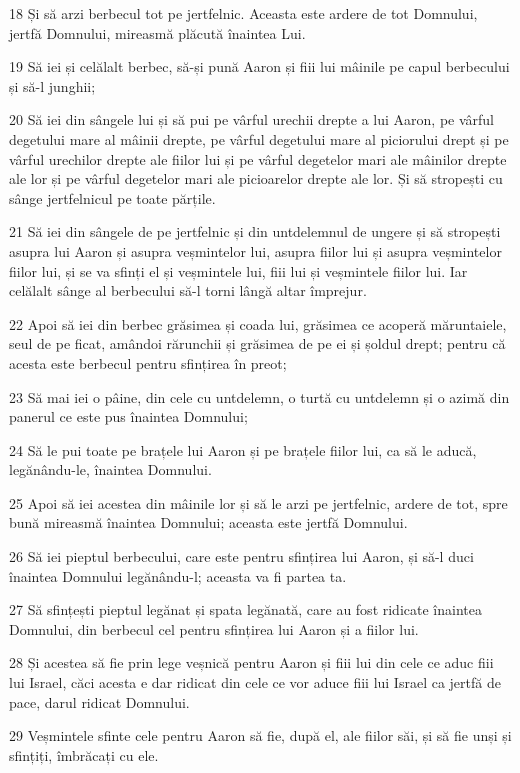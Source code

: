\par 18 Și să arzi berbecul tot pe jertfelnic. Aceasta este ardere de tot Domnului, jertfă Domnului, mireasmă plăcută înaintea Lui.
\par 19 Să iei și celălalt berbec, să-și pună Aaron și fiii lui mâinile pe capul berbecului și să-l junghii;
\par 20 Să iei din sângele lui și să pui pe vârful urechii drepte a lui Aaron, pe vârful degetului mare al mâinii drepte, pe vârful degetului mare al piciorului drept și pe vârful urechilor drepte ale fiilor lui și pe vârful degetelor mari ale mâinilor drepte ale lor și pe vârful degetelor mari ale picioarelor drepte ale lor. Și să stropești cu sânge jertfelnicul pe toate părțile.
\par 21 Să iei din sângele de pe jertfelnic și din untdelemnul de ungere și să stropești asupra lui Aaron și asupra veșmintelor lui, asupra fiilor lui și asupra veșmintelor fiilor lui, și se va sfinți el și veșmintele lui, fiii lui și veșmintele fiilor lui. Iar celălalt sânge al berbecului să-l torni lângă altar împrejur.
\par 22 Apoi să iei din berbec grăsimea și coada lui, grăsimea ce acoperă măruntaiele, seul de pe ficat, amândoi rărunchii și grăsimea de pe ei și șoldul drept; pentru că acesta este berbecul pentru sfințirea în preot;
\par 23 Să mai iei o pâine, din cele cu untdelemn, o turtă cu untdelemn și o azimă din panerul ce este pus înaintea Domnului;
\par 24 Să le pui toate pe brațele lui Aaron și pe brațele fiilor lui, ca să le aducă, legănându-le, înaintea Domnului.
\par 25 Apoi să iei acestea din mâinile lor și să le arzi pe jertfelnic, ardere de tot, spre bună mireasmă înaintea Domnului; aceasta este jertfă Domnului.
\par 26 Să iei pieptul berbecului, care este pentru sfințirea lui Aaron, și să-l duci înaintea Domnului legănându-l; aceasta va fi partea ta.
\par 27 Să sfințești pieptul legănat și spata legănată, care au fost ridicate înaintea Domnului, din berbecul cel pentru sfințirea lui Aaron și a fiilor lui.
\par 28 Și acestea să fie prin lege veșnică pentru Aaron și fiii lui din cele ce aduc fiii lui Israel, căci acesta e dar ridicat din cele ce vor aduce fiii lui Israel ca jertfă de pace, darul ridicat Domnului.
\par 29 Veșmintele sfinte cele pentru Aaron să fie, după el, ale fiilor săi, și să fie unși și sfințiți, îmbrăcați cu ele.

